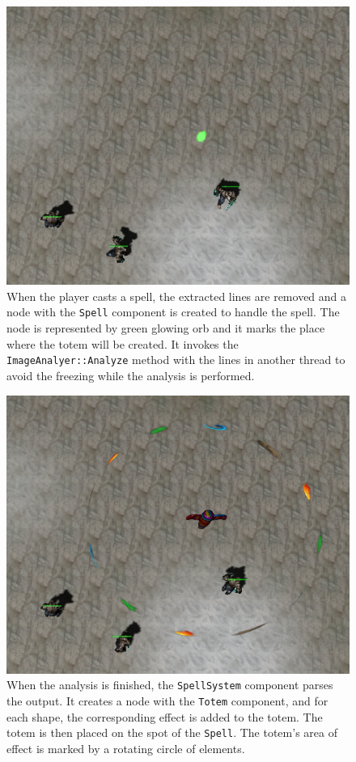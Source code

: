 \begin{figure}[p]
\centering
\includegraphics[width=.9\linewidth]{ext/scr/komix4.png}
\caption{When the player casts a spell, the extracted lines are removed and a node with the \texttt{Spell} component is created to handle the spell.  The node is represented by green glowing orb and it marks the place where the totem will be created. It invokes the \texttt{ImageAnalyer::Analyze} method with the lines in another thread to avoid the freezing while the analysis is performed. }
\label{fig:orb}
\end{figure}

\begin{figure}[p]
\centering
\includegraphics[width=.9\linewidth]{ext/scr/komix5.png}
\caption{When the analysis is finished, the \texttt{SpellSystem} component parses the output. It creates a node with the \texttt{Totem} component, and for each shape, the corresponding effect is added to the totem. The totem is then placed on the spot of the \texttt{Spell}. The totem's area of effect is marked by a rotating circle of elements. }
\label{fig:totem}
\end{figure}

